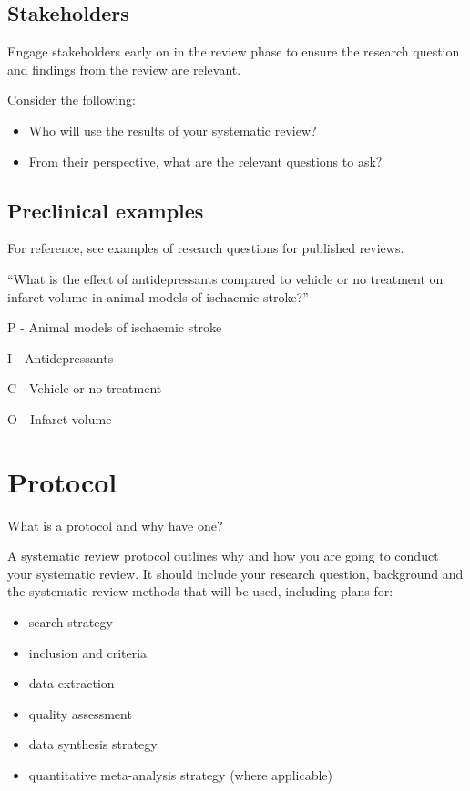 \documentclass[
]{book}
\providecommand{\tightlist}{%
  \setlength{\itemsep}{0pt}\setlength{\parskip}{0pt}}
\begin{document}
\hypertarget{stakeholders}{%
\section{Stakeholders}\label{stakeholders}}

Engage stakeholders early on in the review phase to ensure the research question and findings from the review are relevant.

Consider the following:

\begin{itemize}
\item
  Who will use the results of your systematic review?
\item
  From their perspective, what are the relevant questions to ask?
\end{itemize}

\hypertarget{preclinical-examples}{%
\section{Preclinical examples}\label{preclinical-examples}}

For reference, see examples of research questions for published reviews.

``What is the effect of antidepressants compared to vehicle or no treatment on infarct volume in animal models of ischaemic stroke?''

P - Animal models of ischaemic stroke

I - Antidepressants

C - Vehicle or no treatment

O - Infarct volume

\hypertarget{protocol}{%
\chapter{Protocol}\label{protocol}}

What is a protocol and why have one?

A systematic review protocol outlines why and how you are going to conduct your systematic review. It should include your research question, background and the systematic review methods that will be used, including plans for:

\begin{itemize}
\tightlist
\item
  search strategy
\item
  inclusion and criteria
\item
  data extraction
\item
  quality assessment
\item
  data synthesis strategy
\item
  quantitative meta-analysis strategy (where applicable)
\end{itemize}
\end{document}
